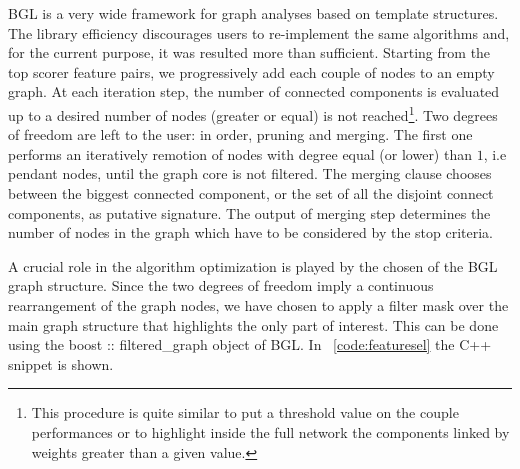 \documentclass{standalone}
\begin{document}
BGL is a very wide framework for graph analyses based on \textsf{template} structures.
The library efficiency discourages users to re-implement the same algorithms and, for the current purpose, it was resulted more than sufficient.
Starting from the top scorer feature pairs, we progressively add each couple of nodes to an empty graph.
At each iteration step, the number of connected components is evaluated up to a desired number of nodes (greater or equal) is not reached\footnote{
  This procedure is quite similar to put a threshold value on the couple performances or to highlight inside the full network the components linked by weights greater than a given value.
}.
Two degrees of freedom are left to the user: in order, \textsf{pruning} and \textsf{merging}.
The first one performs an iteratively remotion of nodes with degree equal (or lower) than $1$, i.e pendant nodes, until the graph core is not filtered.
The \textsf{merging} clause chooses between the biggest connected component, or the set of all the disjoint connect components, as putative signature.
The output of \textsf{merging} step determines the number of nodes in the graph which have to be considered by the stop criteria.

A crucial role in the algorithm optimization is played by the chosen of the BGL graph structure.
Since the two degrees of freedom imply a continuous rearrangement of the graph nodes, we have chosen to apply a filter mask over the main graph structure that highlights the only part of interest.
This can be done using the \textsf{boost :: filtered\_graph} object of BGL.
In ~\ref{code:featuresel} the \textsf{C++} snippet is shown.
\end{document}
